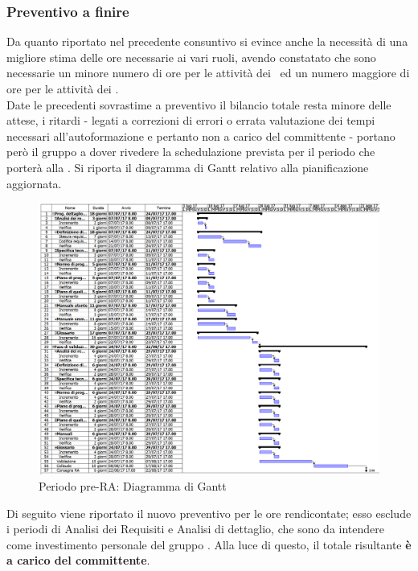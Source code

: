 \documentclass[../PianoDiProgetto.tex]{subfiles}
\begin{document}
	\subsubsection{Preventivo a finire}
	Da quanto riportato nel precedente consuntivo si evince anche la necessità di una migliore stima delle ore necessarie ai vari ruoli, avendo constatato che sono necessarie un minore numero di ore per le attività dei \progettisti\ ed un numero maggiore di ore per le attività dei \programmatori. \\ 
	Date le precedenti sovrastime a preventivo il bilancio totale resta minore delle attese, i ritardi - legati a correzioni di errori o errata valutazione dei tempi necessari all'autoformazione e pertanto non a carico del committente - portano però il gruppo a dover rivedere la schedulazione prevista per il periodo che porterà alla \revisionediaccettazione. Si riporta il diagramma di Gantt relativo alla pianificazione aggiornata. \\
	\begin{figure}[H]
		\centering
		\includegraphics[scale=0.37]{Figures/RQtoRA}
		\caption{Periodo pre-RA: Diagramma di Gantt}
	\end{figure}
	Di seguito viene riportato il nuovo preventivo per le ore rendicontate; esso esclude i periodi di Analisi dei Requisiti e Analisi di dettaglio, che sono da intendere come investimento personale del gruppo \kaleidoscode. Alla luce di questo, il totale risultante \textbf{è a carico del committente}.
	
\end{document}
